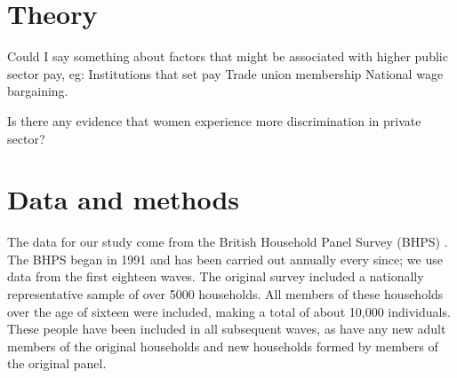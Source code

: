 \documentclass[a4paper,11pt,titlepage]{article}
\begin{document}
\section{Theory}

\begin{db}
Could I say something about factors that might be associated with higher public sector pay, eg:
    Institutions that set pay
    Trade union membership
    National wage bargaining.
\end{db}

\begin{db}
Is there any evidence that women experience more discrimination in private sector?
\end{db}

\section{Data and methods}

The data for our study come from the British Household Panel Survey (BHPS)  \citep{Taylor2010}.  The BHPS began in 1991 and has been carried out annually every since; we use data from the first eighteen waves.  The original survey included a nationally representative sample of over 5000 households.  All members of these households over the age of sixteen were included, making a total of about 10,000 individuals.  These people have been included in all subsequent waves, as have any new adult members of the original households and new households formed by members of the original panel.
\end{document}
